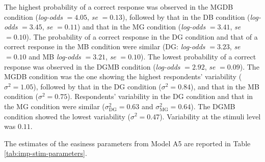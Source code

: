 \documentclass[12pt]{book}
\begin{document}
The highest probability of a correct response was observed in the MGDB condition (\emph{log-odds} $= 4.05$, \emph{se}  $= 0.13$), followed by that in the DB condition (\emph{log-odds} $= 3.45$, \emph{se}  $= 0.11$) and that in the MG condition (\emph{log-odds} $= 3.41$, \emph{se}  $= 0.10$). 
The probability of a correct response in the DG condition and that of a correct response in the MB condition were similar (DG: \emph{log-odds} $= 3.23$, \emph{se}  $= 0.10$ and MB \emph{log-odds} $= 3.21$, \emph{se}  $= 0.10$). The lowest probability of a correct response was observed in the DGMB condition (\emph{log-odds} $= 2.92$, \emph{se}  $= 0.09$). 
The MGDB condition was the one showing the highest respondents' variability ($\sigma^2 = 1.05$), followed by that in the DG condition ($\sigma^2 = 0.84$), and that in the MB condition ($\sigma^2 = 0.75$).
Respondents' variability in the DG condition and that in the MG condition were similar ($\sigma_{\text{DG}}^2 = 0.63$ and $\sigma_{\text{MG}}^2 = 0.64$). The DGMB condition showed the lowest variability ($\sigma^2 = 0.47$).
Variability at the stimuli level was $0.11$.

The estimates of the easiness parameters from Model A5 are reported in Table \ref{tab:imp-stim-parameters}.  
\end{document}
